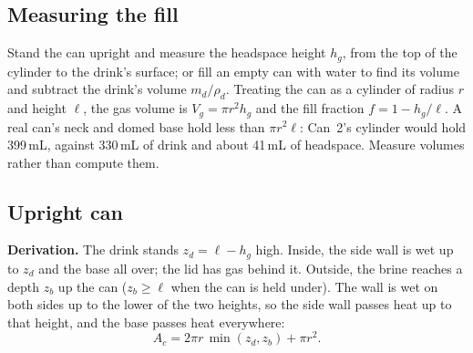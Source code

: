 \documentclass[11pt,a4paper]{article}
\newcommand{\para}[1]{\par\smallskip\noindent\textbf{#1}\enspace}
\begin{document}
\subsection{Measuring the fill}
Stand the can upright and measure the headspace height $h_g$, from the top of the cylinder to the drink's
surface; or fill an empty can with water to find its volume and subtract the drink's volume $m_d/\rho_d$.
Treating the can as a cylinder of radius $r$ and height $\ell$, the gas volume is $V_g = \pi r^2h_g$ and the
fill fraction $f = 1 - h_g/\ell$. A real can's neck and domed base hold less than $\pi r^2\ell$: Can~2's
cylinder would hold 399\,mL, against 330\,mL of drink and about 41\,mL of headspace. Measure volumes rather
than compute them.

\subsection{Upright can}
\para{Derivation.} The drink stands $z_d = \ell - h_g$ high. Inside, the side wall is wet up to $z_d$ and the
base all over; the lid has gas behind it. Outside, the brine reaches a depth $z_b$ up the can
($z_b \ge \ell$ when the can is held under). The wall is wet on both sides up to the lower of the two heights,
so the side wall passes heat up to that height, and the base passes heat everywhere:
\begin{equation}
A_c = 2\pi r\,\min(z_d, z_b) + \pi r^2 . \label{eq:s9-upright}
\end{equation}
\end{document}

